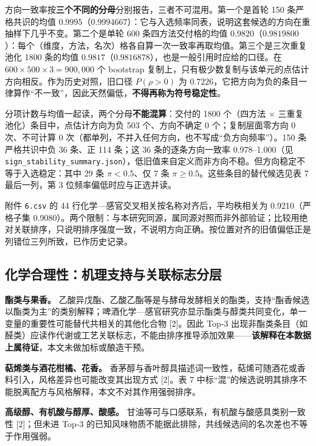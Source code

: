 \documentclass[11pt,a4paper]{article}
\begin{document}
方向一致率按\textbf{三个不同的分母}分别报告，三者不可混用。第一个是首轮
150 条严格共识的均值
\(0.9995\)（\(0.9994667\)）：它与入选频率同表，说明这套候选的方向在重抽样下几乎不变。第二个是单轮
600 条四方法交付格的均值
\(0.9820\)（\(0.9819800\)）：每个（维度，方法，名次）格各自算一次一致率再取均值。第三个是三次重复池化
1800 条的均值 \(0.9817\)（\(0.9816878\)），也是一般引用时应给的口径。在
\(600\times500\times3=900{,}000\) 个 bootstrap
复制上，只有极少数复制与该单元的点估计方向相反。作为历史对照，旧口径
\(P(\rho>0)\) 为
\(0.7226\)，它把方向为负的条目一律算作``不一致''，因此天然偏低，\textbf{不得再称为符号稳定性}。

分项计数与均值一起读，两个分母\textbf{不能混算}：交付的 1800 个（四方法
× 三重复池化）条目中，点估计方向为负 503 个、方向不确定 0
个；复制层面零方向 0 次、不可计算 0
次（都单列，不并入任何方向，也不写成``负方向频率''）。150 条严格共识中负
36 条、正 114 条；这 36 条的逐条方向一致率 0.978--1.000（见
\texttt{sign\_stability\_summary.json}），低旧值来自定义而非方向不稳。但方向稳定不等于入选稳定：其中
29 条 \(\pi<0.5\)、仅 7 条 \(\pi\ge0.5\)。这些条目的替代候选见表 7
最后一列，第 3 位频率偏低时应与正选并读。

附件 \texttt{6.csv} 的 44
行化学---感官交叉相关按名称对齐后，平均秩相关为 0.9210（严格子集
0.9080）。两个限制：与本研究同源，属同源对照而非外部验证；比较用绝对关联排序，只说明排序强度一致，不说明方向正确。按位置对齐的旧值偏低正是列错位三列所致，已作历史记录。

\subsection{化学合理性：机理支持与关联标志分层}\label{ux5316ux5b66ux5408ux7406ux6027ux673aux7406ux652fux6301ux4e0eux5173ux8054ux6807ux5fd7ux5206ux5c42}

\textbf{酯类与果香。}
乙酸异戊酯、乙酸乙酯等是与酵母发酵相关的酯类，支持``酯香候选以酯类为主''的类别解释；啤酒化学---感官研究亦显示酯类与醇类共同变化，单一变量的重要性可能替代共相关的其他化合物
{[}2{]}。因此 Top-3
出现非酯类条目（如醛类）应读作代谢或工艺关联标志，不能由排序推导添加效果------\textbf{该解释在本数据上属待证}，本文未做加标或酿造干预。

\textbf{萜烯类与酒花柑橘、花香。}
香茅醇与香叶醇具描述词一致性，萜烯可随酒花或香料引入，风格差异也可能改变其出现方式
{[}2{]}。表 7
中标``混''的候选说明其排序不能脱离配方与风格解释，本文不对其作用强弱排序。

\textbf{高级醇、有机酸与醇厚、酸感。}
甘油等可与口感联系，有机酸与酸感具类别一致性 {[}2{]}；但未进 Top-3
的已知风味物质不能据此排除，共线候选间的名次差也不等于作用强弱。
\end{document}
